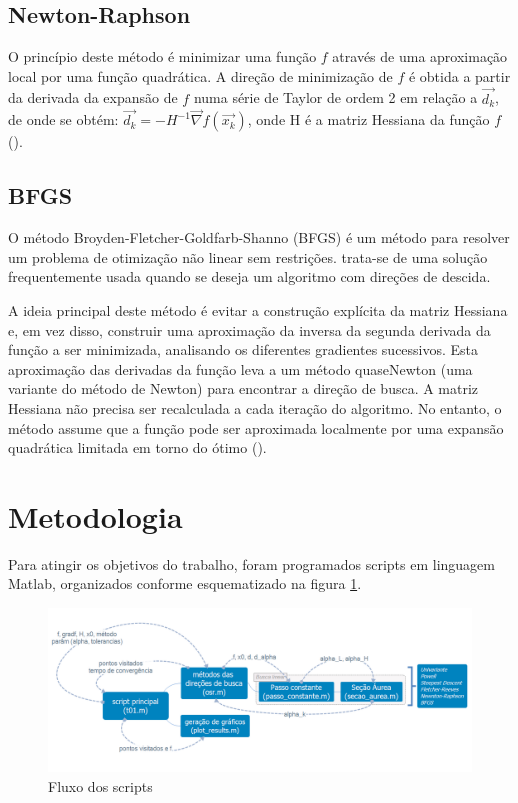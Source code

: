 \documentclass[10pt, a4paper]{article}
\begin{document}
\subsection{Newton-Raphson}

O princ\'ipio deste m\'etodo \'e minimizar uma fun\c c\~ao $f$ atrav\'es de uma aproxima\c c\~ao local por uma fun\c c\~ao quadr\'atica. A dire\c c\~ao de minimiza\c c\~ao de $f$ \'e obtida a partir da derivada da expans\~ao de $f$ numa s\'erie de Taylor de ordem 2 em rela\c c\~ao a $\vec{d_{k}}$, de onde se obt\'em: $\vec{d_{k}}=-H^{-1} \vec{\nabla} f(\vec{x_{k}})$, onde H \'e a matriz Hessiana da fun\c c\~ao $f$ (\cite{apostila}).

\subsection{BFGS}

O m\'etodo Broyden-Fletcher-Goldfarb-Shanno (BFGS) \'e um m\'etodo para resolver um problema de otimiza\c c\~ao n\~ao linear sem restri\c c\~oes. trata-se de uma solu\c c\~ao frequentemente usada quando se deseja um algoritmo com dire\c c\~oes de descida.

A ideia principal deste m\'etodo \'e evitar a constru\c c\~ao expl\'icita da matriz Hessiana e, em vez disso, construir uma aproxima\c c\~ao da inversa da segunda derivada da fun\c c\~ao a ser minimizada, analisando os diferentes gradientes sucessivos. Esta aproxima\c c\~ao das derivadas da fun\c c\~ao leva a um m\'etodo quase\-Newton (uma variante do m\'etodo de Newton) para encontrar a dire\c c\~ao de busca. A matriz Hessiana n\~ao precisa ser recalculada a cada itera\c c\~ao do algoritmo. No entanto, o m\'etodo assume que a fun\c c\~ao pode ser aproximada localmente por uma expans\~ao quadr\'atica limitada em torno do \'otimo (\cite{bfgs}).

\section{Metodologia}

Para atingir os objetivos do trabalho, foram programados scripts em linguagem Matlab, organizados conforme esquematizado na figura \ref{fig:fluxo}.

\begin{figure}[H]
      \centering
      \includegraphics[width=.9\textwidth]{t01.png}
      \caption{Fluxo dos scripts}
      \label{fig:fluxo}
\end{figure}
\end{document}

